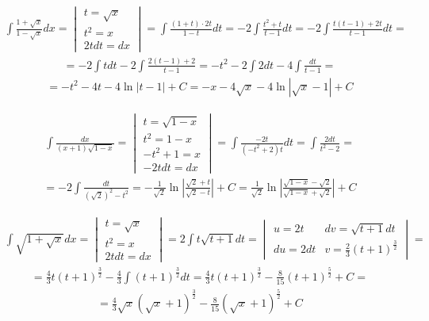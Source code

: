 
\begin{gather*}\int \frac{1+\sqrt{x}}{1-\sqrt{x}}dx = \begin{vmatrix}
t=\sqrt{x} \\
t^2=x \\
2tdt=dx
\end{vmatrix} = \int \frac{(1+t) \cdot 2t}{1-t}dt = -2\int \frac{t^2+t}{t-1}dt = -2\int \frac{t(t-1)+2t}{t-1}dt = \end{gather*}
\begin{gather*}= -2 \int tdt -2\int \frac{2(t-1)+2}{t-1} = -t^2-2\int2dt-4\int \frac{dt}{t-1} = \end{gather*}
\begin{gather*}= -t^2-4t-4\ln|t-1|+C = -x-4\sqrt{x}-4\ln|\sqrt{x}-1|+C\end{gather*}



\begin{gather*}\int \frac{dx}{(x+1)\sqrt{1-x}} = \begin{vmatrix}
t=\sqrt{1-x} \\
t^2=1-x \\
-t^2+1=x \\
-2tdt=dx
\end{vmatrix} = \int \frac{-2t}{(-t^2+2)t}dt = \int \frac{2dt}{t^2-2} = \end{gather*}
\begin{gather*}= -2 \int \frac{dt}{(\sqrt{2})^2-t^2} = -\frac{1}{\sqrt{2}}\ln\left|\frac{\sqrt{2}+t}{\sqrt{2}-t}\right|+C = \frac{1}{\sqrt{2}}\ln\left|\frac{\sqrt{1-x}-\sqrt{2}}{\sqrt{1-x}+\sqrt{2}}\right|+C\end{gather*}



\begin{gather*}\int \sqrt{1+\sqrt{x}}dx = \begin{vmatrix}
t=\sqrt{x} \\
t^2=x \\
2tdt=dx \end{vmatrix} = 2\int t\sqrt{t+1}dt = \begin{vmatrix}
u=2t & dv=\sqrt{t+1}dt \\
du=2dt & v=\frac{2}{3}(t+1)^{\frac{3}{2}}
\end{vmatrix} = \end{gather*}
\begin{gather*}= \frac{4}{3}t(t+1)^{\frac{3}{2}} - \frac{4}{3}\int (t+1)^{\frac{3}{2}}dt = \frac{4}{3}t(t+1)^{\frac{3}{2}}-\frac{8}{15}(t+1)^{\frac{5}{2}}+C = \end{gather*}
\begin{gather*}= \frac{4}{3}\sqrt{x}(\sqrt{x}+1)^{\frac{3}{2}}-\frac{8}{15}(\sqrt{x}+1)^{\frac{5}{2}}+C\end{gather*}


